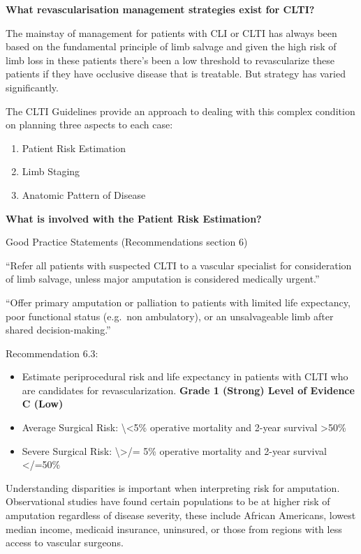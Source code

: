 \documentclass[
]{book}
\begin{document}
\textbf{What revascularisation management strategies exist for CLTI?}

The mainstay of management for patients with CLI or CLTI has always been
based on the fundamental principle of limb salvage and given the high
risk of limb loss in these patients there's been a low threshold to
revascularize these patients if they have occlusive disease that is
treatable. But strategy has varied significantly.

The CLTI Guidelines provide an approach to dealing with this complex
condition on planning three aspects to each case:

\begin{enumerate}
\def\labelenumi{\arabic{enumi}.}
\item
  Patient Risk Estimation
\item
  Limb Staging
\item
  Anatomic Pattern of Disease
\end{enumerate}

\textbf{What is involved with the Patient Risk Estimation?}

Good Practice Statements (Recommendations section 6)

``Refer all patients with suspected CLTI to a vascular specialist for
consideration of limb salvage, unless major amputation is considered
medically urgent.''

``Offer primary amputation or palliation to patients with limited life
expectancy, poor functional status (e.g.~non ambulatory), or an
unsalvageable limb after shared decision-making.''

Recommendation 6.3:

\begin{itemize}
\item
  Estimate periprocedural risk and life expectancy in patients with
  CLTI who are candidates for revascularization. \textbf{Grade 1 (Strong)
  Level of Evidence C (Low)}
\item
  Average Surgical Risk: \textbackslash\textless5\% operative mortality and 2-year
  survival \textgreater50\%
\item
  Severe Surgical Risk: \textbackslash\textgreater/= 5\% operative mortality and 2-year
  survival \textless/=50\%
\end{itemize}

Understanding disparities is important when interpreting risk for
amputation. Observational studies have found certain populations to be
at higher risk of amputation regardless of disease severity, these
include African Americans, lowest median income, medicaid insurance,
uninsured, or those from regions with less access to vascular
surgeons.\citep{hughes2019, ho2005, eslami2007}
\end{document}
